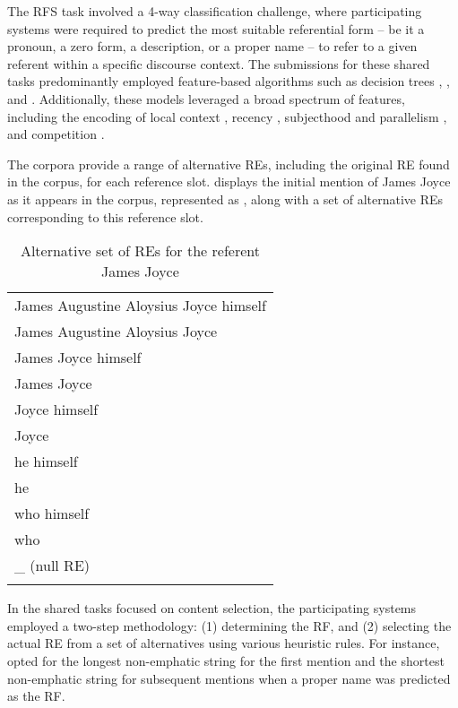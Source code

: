  The \grec RFS task involved a 4-way classification challenge, where participating systems were required to predict the most suitable referential form -- be it a pronoun, a zero form, a description, or a proper name -- to refer to a given referent within a specific discourse context. The submissions for these shared tasks predominantly employed feature-based algorithms such as  decision trees \citep{greenbacker2009udel, orasan-dornescu-2009-wlv},  \citep{bohnet2008g}, and  \citep{favre2009icsi}. Additionally, these models leveraged a broad spectrum of features, including the encoding of local context \citep{hendrickx2008cnts, favre2009icsi}, recency \citep{jamison2008osu}, subjecthood and parallelism \citep{greenbacker2009udel}, and competition \citep{jamison2008osu}.

The \grec corpora provide a range of alternative REs, including the original RE found in the corpus, for each reference slot.  displays the initial mention of James Joyce as it appears in the corpus, represented as , along with a set of alternative REs corresponding to this reference slot.

\begin{table}
	\caption{Alternative set of REs for the referent James Joyce}
	\begin{tabular}{l} 
		\lsptoprule
  James Augustine Aloysius Joyce himself \\
  James Augustine Aloysius Joyce \\ 
  James Joyce himself \\
  James Joyce \\
  Joyce himself \\
  Joyce \\ 
  he himself \\
  he \\
  who himself  \\
  who \\
  \_ (null RE) \\ 
		\lspbottomrule
	\end{tabular}
\end{table}

In the shared tasks focused on content selection, the participating systems employed a two-step methodology: (1) determining the RF, and (2) selecting the actual RE from a set of alternatives using various heuristic rules. For instance, \citet{greenbacker2009udel} opted for the longest non-emphatic string for the first mention and the shortest non-emphatic string for subsequent mentions when a proper name was predicted as the RF. 

